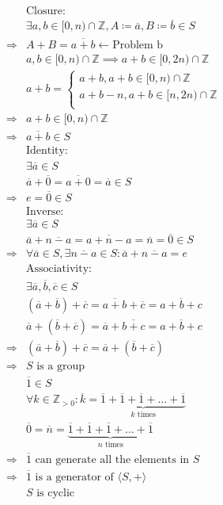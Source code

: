 \documentclass{article}
\begin{document}
\begin{equation*}
    \begin{split}
        &\text{Closure}:\\
        &\exists a,b\in[0,n)\cap\mathbb{Z} ,A\coloneqq \overline{a},B\coloneqq \overline{b}\in S\\
        \Rightarrow&A+B=\overline{a+b}\leftarrow\text{Problem b}\\
        &a,b\in[0,n)\cap\mathbb{Z}\implies a+b\in[0,2n)\cap\mathbb{Z}\\
        &a+b=\begin{cases*}
            a+b,a+b\in[0,n)\cap\mathbb{Z}\\
            a+b-n,a+b\in[n,2n)\cap\mathbb{Z}\\
        \end{cases*}\\
        \Rightarrow&a+b\in[0,n)\cap\mathbb{Z}\\
        \Rightarrow&\overline{a+b}\in S\\
        &\text{Identity}:\\
        &\exists \overline{a}\in S\\
        &\overline{a}+\overline{0}=\overline{a+0}=\overline{a}\in S\\
        \Rightarrow&e=\overline{0}\in S\\
        &\text{Inverse}:\\
        &\exists \overline{a}\in S\\
        &\overline{a}+\overline{n-a}=\overline{a+n-a}=\overline{n}=\overline{0}\in S\\
        \Rightarrow&\forall\overline{a}\in S,\exists \overline{n-a}\in S:\overline{a}+\overline{n-a}=e\\
        &\text{Associativity}:\\
        &\exists \overline{a},\overline{b},\overline{c}\in S\\
        &(\overline{a}+\overline{b})+\overline{c}=\overline{a+b}+\overline{c}=\overline{a+b+c}\\
        &\overline{a}+(\overline{b}+\overline{c})=\overline{a}+\overline{b+c}=\overline{a+b+c}\\
        \Rightarrow&(\overline{a}+\overline{b})+\overline{c}=\overline{a}+(\overline{b}+\overline{c})\\
        \Rightarrow&S\text{ is a group}\\
        &\overline{1}\in S\\
        &\forall k\in\mathbb{Z} _{>0}:\overline{k}=\underbrace{\overline{1}+\overline{1}+\overline{1}+...+\overline{1}}_{k\text{ times}}\\
        &\overline{0}=\overline{n}=\underbrace{\overline{1}+\overline{1}+\overline{1}+...+\overline{1}}_{n\text{ times}}\\
        \Rightarrow&\overline{1}\text { can generate all the elements in }S\\
        \Rightarrow&\overline{1}\text{ is a generator of }\langle S,+\rangle\\
        &S\text{ is cyclic}\\
    \end{split}
\end{equation*}
\end{document}
